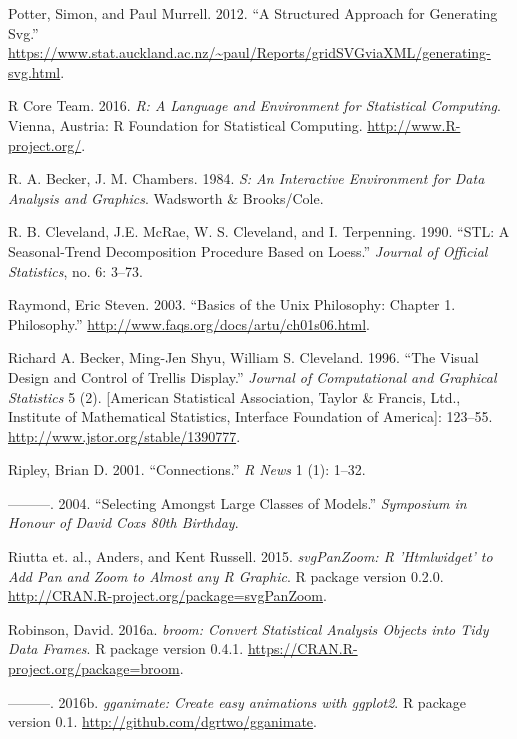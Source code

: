 \documentclass[12pt,]{isuthesis}
\begin{document}
\hypertarget{ref-gridSVGreport}{}
Potter, Simon, and Paul Murrell. 2012. ``A Structured Approach for
Generating Svg.''
\url{https://www.stat.auckland.ac.nz/~paul/Reports/gridSVGviaXML/generating-svg.html}.

\hypertarget{ref-RCore}{}
R Core Team. 2016. \emph{R: A Language and Environment for Statistical
Computing}. Vienna, Austria: R Foundation for Statistical Computing.
\url{http://www.R-project.org/}.

\hypertarget{ref-S:1984}{}
R. A. Becker, J. M. Chambers. 1984. \emph{S: An Interactive Environment
for Data Analysis and Graphics}. Wadsworth \& Brooks/Cole.

\hypertarget{ref-stl}{}
R. B. Cleveland, J.E. McRae, W. S. Cleveland, and I. Terpenning. 1990.
``STL: A Seasonal-Trend Decomposition Procedure Based on Loess.''
\emph{Journal of Official Statistics}, no. 6: 3--73.

\hypertarget{ref-unix-philosophy}{}
Raymond, Eric Steven. 2003. ``Basics of the Unix Philosophy: Chapter 1.
Philosophy.'' \url{http://www.faqs.org/docs/artu/ch01s06.html}.

\hypertarget{ref-trellis}{}
Richard A. Becker, Ming-Jen Shyu, William S. Cleveland. 1996. ``The
Visual Design and Control of Trellis Display.'' \emph{Journal of
Computational and Graphical Statistics} 5 (2). {[}American Statistical
Association, Taylor \& Francis, Ltd., Institute of Mathematical
Statistics, Interface Foundation of America{]}: 123--55.
\url{http://www.jstor.org/stable/1390777}.

\hypertarget{ref-Connections}{}
Ripley, Brian D. 2001. ``Connections.'' \emph{R News} 1 (1): 1--32.

\hypertarget{ref-Ripley:2004}{}
---------. 2004. ``Selecting Amongst Large Classes of Models.''
\emph{Symposium in Honour of David Coxs 80th Birthday}.

\hypertarget{ref-svgPanZoom}{}
Riutta et. al., Anders, and Kent Russell. 2015. \emph{svgPanZoom: R
'Htmlwidget' to Add Pan and Zoom to Almost any R Graphic}. R package
version 0.2.0. \url{http://CRAN.R-project.org/package=svgPanZoom}.

\hypertarget{ref-broom}{}
Robinson, David. 2016a. \emph{broom: Convert Statistical Analysis
Objects into Tidy Data Frames}. R package version 0.4.1.
\url{https://CRAN.R-project.org/package=broom}.

\hypertarget{ref-gganimate}{}
---------. 2016b. \emph{gganimate: Create easy animations with ggplot2}.
R package version 0.1. \url{http://github.com/dgrtwo/gganimate}.
\end{document}
